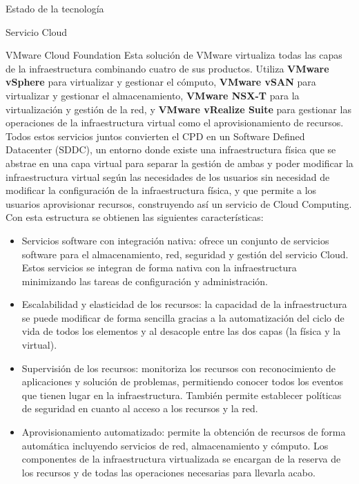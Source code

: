 \begin{chapter}{Estado de la tecnología}
\begin{section}{Servicio Cloud}
\begin{subsection}{VMware Cloud Foundation}
        Esta solución de VMware virtualiza todas las capas de la infraestructura combinando cuatro de sus productos. Utiliza \textbf{VMware vSphere} para virtualizar y gestionar el cómputo, \textbf{VMware vSAN} para virtualizar y gestionar el almacenamiento, \textbf{VMware NSX-T} para la virtualización y gestión de la red, y \textbf{VMware vRealize Suite} para gestionar las operaciones de la infraestructura virtual como el aprovisionamiento de recursos. Todos estos servicios juntos convierten el CPD en un Software Defined Datacenter (SDDC), un entorno donde existe una infraestructura física que se abstrae en una capa virtual para separar la gestión de ambas y poder modificar la infraestructura virtual según las necesidades de los usuarios sin necesidad de modificar la configuración de la infraestructura física, y que permite a los usuarios aprovisionar recursos, construyendo así un servicio de Cloud Computing. Con esta estructura se obtienen las siguientes características:
        
    \begin{itemize}
    
        \item Servicios software con integración nativa: ofrece un conjunto de servicios software para el almacenamiento, red, seguridad y gestión del servicio Cloud. Estos servicios se integran de forma nativa con la infraestructura minimizando las tareas de configuración y administración.
    
        \item Escalabilidad y elasticidad de los recursos: la capacidad de la infraestructura se puede modificar de forma sencilla gracias a la automatización del ciclo de vida de todos los elementos y al desacople entre las dos capas (la física y la virtual).
    
        \item Supervisión de los recursos: monitoriza los recursos con reconocimiento de aplicaciones y solución de problemas, permitiendo conocer todos los eventos que tienen lugar en la infraestructura. También permite establecer políticas de seguridad en cuanto al acceso a los recursos y la red.
    
        \item Aprovisionamiento automatizado: permite la obtención de recursos de forma automática incluyendo servicios de red, almacenamiento y cómputo. Los componentes de la infraestructura virtualizada se encargan de la reserva de los recursos y de todas las operaciones necesarias para llevarla acabo.
    

\end{itemize}
\end{subsection}
\end{section}
\end{chapter}
